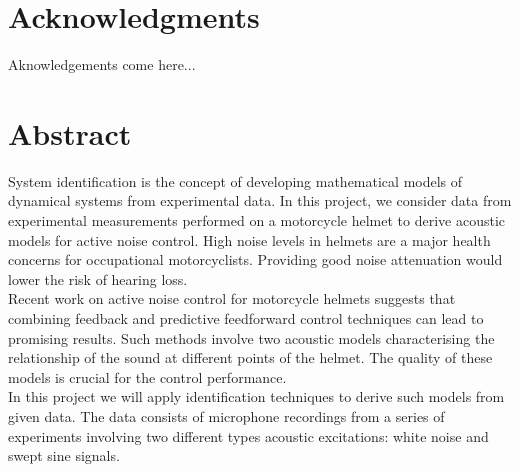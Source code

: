 \section*{Acknowledgments}

Aknowledgements come here...


 \cleardoublepage


 \setcounter{tocdepth}{2}
 \tableofcontents



 \listoffigures %
 \cleardoublepage



\section*{Abstract}

System identification is the concept of developing mathematical models of dynamical systems from experimental data. In this project, we consider data from experimental measurements performed on a motorcycle helmet to derive acoustic models for active noise control. High noise levels in helmets are a major health concerns for occupational motorcyclists. Providing good noise attenuation would lower the risk of hearing loss.\\

Recent work on active noise control for motorcycle helmets suggests that combining feedback and predictive feedforward control techniques can lead to promising results. Such methods involve two acoustic models characterising the relationship of the sound at different points of the  helmet. The quality of these models is crucial for the control performance.\\

In this project we will apply identification techniques to derive such models from given data. The data consists of microphone recordings from a series of experiments involving two different types acoustic excitations: white noise and swept sine signals. 

